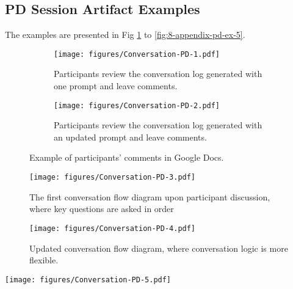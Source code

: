 \subsection{PD Session Artifact Examples}
The examples are presented in Fig \ref{fig:8-appendix-pd-ex-1} to \ref{fig:8-appendix-pd-ex-5}.
\begin{figure}[h]
\centering
\begin{subfigure}[b]{\textwidth}
    \texttt{[image: figures/Conversation-PD-1.pdf]}
    \caption{Participants review the conversation log generated with one prompt and leave comments.}
    \label{fig:8-appendix-pd-ex-1}
\end{subfigure}

\begin{subfigure}[b]{\textwidth}
    \texttt{[image: figures/Conversation-PD-2.pdf]}
    \caption{Participants review the conversation log generated with an updated prompt and leave comments.}
    \label{fig:8-appendix-pd-ex-2}
\end{subfigure}
\caption{Example of participants' comments in Google Docs.}
\label{fig:8-appendix-pd-ex-1-2}
\end{figure}


\begin{figure*}[h]
\centering
\begin{subfigure}[b]{0.45\textwidth}
    \texttt{[image: figures/Conversation-PD-3.pdf]}
    \caption{The first conversation flow diagram upon participant discussion, where key questions are asked in order}
    \label{fig:8-appendix-pd-ex-3}
\end{subfigure}
\hfill %
\begin{subfigure}[b]{0.45\textwidth}
    \texttt{[image: figures/Conversation-PD-4.pdf]}
    \caption{Updated conversation flow diagram, where conversation logic is more flexible.}
    \label{fig:8-appendix-pd-ex-4}
\end{subfigure}
\caption{Example of conversation flow iteration.}
\label{fig:8-appendix-pd-ex-3-4}
\end{figure*}

\begin{figure*}
    \centering
    \texttt{[image: figures/Conversation-PD-5.pdf]}
    \caption{Participants discussed the color coding depending on the priority of a symptom, and which questions should include a meter with scale.}
    \label{fig:8-appendix-pd-ex-5}
\end{figure*}

